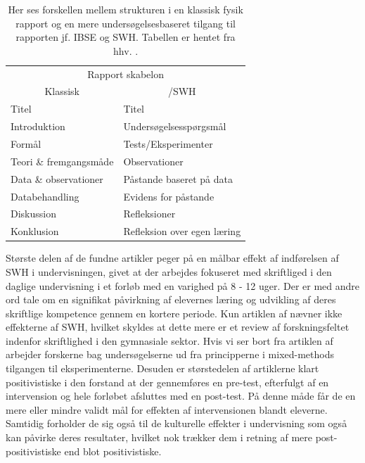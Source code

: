 \begin{table}
	\centering
	\caption[Rapport skabeloner]{Her ses forskellen mellem strukturen i en klassisk fysik rapport og en mere undersøgelsesbaseret tilgang til rapporten jf. IBSE og SWH. Tabellen er hentet fra hhv. 
	\citet{Burke2005, Keys1999}.}
	\label{tbl:2.1}
	\begin{tabular}{@{ } l l @{ }}
		\toprule[2.5pt]
			\multicolumn{2}{c}{Rapport skabelon}\\
			\multicolumn{1}{c}{Klassisk} & \multicolumn{1}{c}{\ib{}/SWH}\\
		\midrule[1.25pt]
			Titel				&	Titel\\
			Introduktion			&	Undersøgelsesspørgsmål\\
			Formål			& 	Tests/Eksperimenter\\
			Teori \& fremgangsmåde		&	Observationer\\
			Data \& observationer	&	Påstande baseret på data\\
			Databehandling		&	Evidens for påstande\\
			Diskussion			&	Refleksioner\\
			Konklusion			&	Refleksion over egen læring\\
		\bottomrule[2.5pt]
	\end{tabular}
\end{table}

Største delen af de fundne artikler peger på en målbar effekt af indførelsen af SWH i undervisningen, givet at der arbejdes fokuseret med skriftliged i den daglige undervisning i et forløb med en varighed på 8 - 12 uger. Der er med andre ord tale om en signifikat påvirkning af elevernes læring og udvikling af deres skriftlige kompetence gennem en kortere periode. Kun artiklen af \citep{Miller2018} nævner ikke effekterne af SWH, hvilket skyldes at dette mere er et review af forskningsfeltet indenfor skriftlighed i den gymnasiale sektor. Hvis vi ser bort fra artiklen af \citep{Miller2018, Dolin2014, Krogh2016} arbejder forskerne bag undersøgelserne ud fra principperne i mixed-methods tilgangen til eksperimenterne. Desuden er størstedelen af artiklerne klart positivistiske i den forstand at der gennemføres en pre-test, efterfulgt af en intervension og hele forløbet afsluttes med en post-test. På denne måde får de en mere eller mindre validt mål for effekten af intervensionen blandt eleverne. Samtidig forholder de sig også til de kulturelle effekter i undervisning som også kan påvirke deres resultater, hvilket nok trækker dem i retning af mere post-positivistiske end blot positivistiske.


